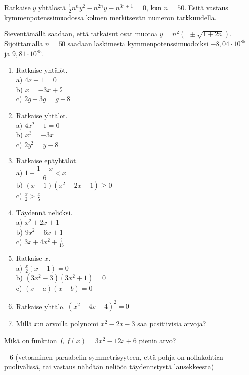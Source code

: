 \begin{tehtava}
Ratkaise $y$ yhtälöstä $\frac{1}{2}n^n y^2-n^{2n}y-n^{3n+1}=0$, kun $n=50$. Esitä vastaus kymmenpotenssimuodossa kolmen merkitsevän numeron tarkkuudella.
	\begin{vastaus}
	Sieventämällä saadaan, että ratkaisut ovat muotoa $y=n^2 (1\pm \sqrt{1+2n})$. Sijoittamalla $n=50$ saadaan laskimesta kymmenpotenssimuodoiksi $-8,04\cdot 10^{85}$ ja $9,81\cdot 10^{85}$.
	\end{vastaus}
\end{tehtava}

\begin{enumerate}
\item Ratkaise yhtälöt.\\ a) $4x-1=0$\\ b) $x=-3x+2$\\ c) $2g-3g=g-8$
\item Ratkaise yhtälöt.\\ a) $4x^2-1=0$\\ b) $x^3=-3x$\\ c) $2y^2=y-8$
\item Ratkaise epäyhtälöt.\\ a) $1-\dfrac{1-x}{6}<x$\\ b) $(x+1)(x^2-2x-1)\geq0$\\ c) $\frac{x}{2}>\frac{x}{5}$
\item Täydennä neliöksi. \\ a) $x^2+2x+1$\\ b) $9x^2-6x+1$\\ c) $3x+4x^2+\frac{9}{16}$
\item Ratkaise $x$. \\ a) $\frac{x}{2}(x-1)=0$\\ b) $(3x^2-3)(3x^2+1)=0$\\ c) $(x-a)(x-b)=0$
\item Ratkaise yhtälö. $(x^2-4x+4)^2=0$
\item Millä $x$:n arvoilla polynomi $x^2-2x-3$ saa positiivisia arvoja?
\end{enumerate}

\begin{tehtava}
Mikä on funktion $f$, $f(x)=3x^2-12x+6$ pienin arvo?
	\begin{vastaus}
	$-6$ (vetoaminen paraabelin symmetrisyyteen, että pohja on nollakohtien puolivälissä, tai vastaus nähdään neliöön täydennetystä lausekkeesta)
	\end{vastaus}
\end{tehtava}
	
